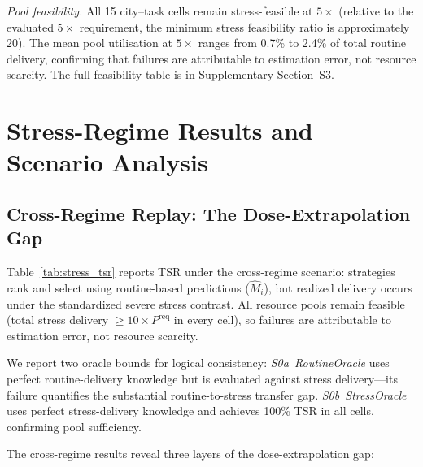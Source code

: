 \documentclass[utf8]{FrontiersinHarvard}
\newcommand{\Mhat}{\widehat{M}}
\newcommand{\Preq}{P^{\mathrm{req}}}
\begin{document}
\textit{Pool feasibility.}
All 15 city--task cells remain stress-feasible at $5\times$
(relative to the evaluated $5\times$ requirement, the minimum
stress feasibility ratio is approximately 20). The mean pool
utilisation at $5\times$ ranges from 0.7\% to 2.4\% of total
routine delivery, confirming that failures are attributable
to estimation error, not resource scarcity. The full
feasibility table is in Supplementary Section~S3.

\section{Stress-Regime Results and Scenario Analysis}
\label{sec:scenario}

\subsection{Cross-Regime Replay: The Dose-Extrapolation Gap}

Table~\ref{tab:stress_tsr} reports TSR under the cross-regime
scenario: strategies rank and select using routine-based
predictions ($\Mhat_i$), but realized delivery occurs under the
standardized severe stress contrast. All resource pools remain
feasible (total stress delivery $\geq 10 \times \Preq$ in every
cell), so failures are attributable to estimation error, not
resource scarcity.

We report two oracle bounds for logical consistency:
\textit{S0a~RoutineOracle} uses perfect routine-delivery
knowledge but is evaluated against stress delivery---its failure
quantifies the substantial routine-to-stress transfer gap.
\textit{S0b~StressOracle} uses perfect stress-delivery knowledge
and achieves 100\% TSR in all cells, confirming pool sufficiency.

The cross-regime results reveal three layers of the
dose-extrapolation gap:
\end{document}
